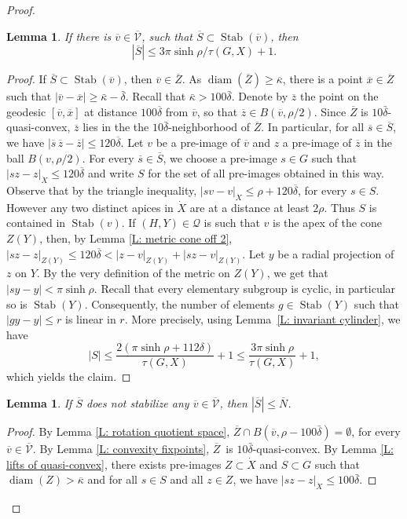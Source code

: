 \documentclass[JEP,XML,SOM,Unicode, NoEqCountersInSection,published]{cedram}
\let\mathcal\mathscr
\theoremstyle{plain}
\newtheorem{lem}[thm]{Lemma}
\theoremstyle{definition}
\DeclareMathOperator{\diam}{diam}
\newcommand{\cX}{\dot{X}}
\newcommand{\q}[1]{\overline{#1}}
\newcommand{\stab}[1]{\operatorname{Stab}(#1)}
\begin{document}
\begin{proof}
\begin{lem}\label{L: acylindric quotient 2} If there is $\q v \in \q {\mathcal V}$, such that $\q S \subset \stab{\q v}$, then
\[
|\q S|\leqslant 3\pi \sinh\rho/\tau(G,X) +1.
\]
\end{lem}
\begin{proof} If $\q S \subset \stab{\q v}$, then $\q v\in \q Z$.
As $\diam (\q Z)\geqslant \q \kappa$, there is a point $\q x \in \q Z$ such that $|\q v - \q x| \geq \bar \kappa - \bar \delta$.
Recall that $\bar \kappa > 100 \bar \delta$.
Denote by $\q z$ the point on the geodesic $[\q v, \q x]$ at distance $100\q \delta$ from $\q v$, so that $\q z \in B(\q v, \rho/2)$.
Since $\q Z$ is $10\bar \delta$-quasi-convex, $\q z$ lies in the the $10\bar \delta$-neighborhood of $\q Z$.
In particular, for all $\q s \in \q S$, we have $|\q s \,\q z - \q z|\leqslant 120\q \delta$.
Let $v$ be a pre-image of $\q v$ and $z$ a pre-image of $\q z$ in the ball $B(v, \rho/2)$.
For every $\q s \in \q S$, we choose a pre-image $s \in G$ such that $|sz-z|_{\cX}\leqslant120 \q \delta$ and write $S$ for the set of all pre-images obtained in this way.
Observe that by the triangle inequality, $|sv - v|_{\cX} \leq \rho + 120\q\delta$, for every $s \in S$.
However any two distinct apices in $\cX$ are at a distance at least $2\rho$.
Thus $S$ is contained in $\stab v$.
If $(H,Y) \in \mathcal Q$ is such that $v$ is the apex of the cone $Z(Y)$, then, by Lemma \ref{L: metric cone off 2}, $|sz-z|_{Z(Y)}\leqslant 120\q \delta < |z - v|_{Z(Y)} + |sz - v|_{Z(Y)}$.
Let $y$ be a radial projection of $z$ on $Y$.
By the very definition of the metric on $Z(Y)$, we get that $|sy-y|< \pi \sinh\rho$.
Recall that every elementary subgroup is cyclic, in particular so is $\stab Y$.
Consequently, the number of elements $g \in \stab Y$ such that $|gy - y| \leq r$ is linear in $r$.
More precisely, using Lemma~\ref{L: invariant cylinder}, we have
\begin{equation*}
|S|\leqslant \frac{2(\pi \sinh\rho +112\delta)}{\tau(G,X)} + 1\leqslant \frac{3 \pi \sinh\rho}{\tau(G,X)}+1,
\end{equation*}
which yields the claim.
\end{proof}

\begin{lem}\label{L: acylindric quotient 4} If $\q S$ does not stabilize any $\q v \in \q{\mathcal V}$, then $|\q S|\leqslant \q N$.
\end{lem}

\begin{proof}
By Lemma \ref{L: rotation quotient space}, $\q Z \cap B(\q v, \rho- 100 \bar \delta)= \emptyset$, for every $\q v \in \q {\mathcal V}$.
By Lemma \ref{L: convexity fixpoints}, $\q Z$~is $10\bar \delta$-quasi-convex.
By Lemma \ref{L: lifts of quasi-convex}, there exists pre-images ${Z} \subset \cX$ and $S\subset G$ such that $\diam({Z})>\q \kappa$ and for all $s\in S$ and all $z\in Z$, we have $|sz-z|_{\cX}\leqslant 100 \bar \delta$.


\end{proof}
\end{proof}
\end{document}
